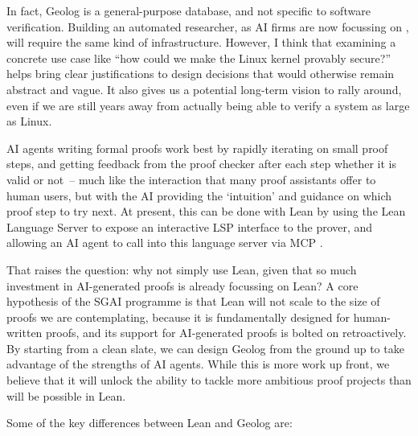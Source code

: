 \documentclass{article}
\begin{document}
In fact, Geolog is a general-purpose database, and not specific to software verification.
Building an automated researcher, as AI firms are now focussing on \citep{Heaven2026}, will require the same kind of infrastructure.
However, I think that examining a concrete use case like ``how could we make the Linux kernel provably secure?'' helps bring clear justifications to design decisions that would otherwise remain abstract and vague.
It also gives us a potential long-term vision to rally around, even if we are still years away from actually being able to verify a system as large as Linux.

AI agents writing formal proofs work best by rapidly iterating on small proof steps, and getting feedback from the proof checker after each step whether it is valid or not~-- much like the interaction that many proof assistants offer to human users, but with the AI providing the `intuition' and guidance on which proof step to try next.
At present, this can be done with Lean by using the Lean Language Server to expose an interactive LSP interface to the prover, and allowing an AI agent to call into this language server via MCP \citep{lean-lsp-mcp}.

That raises the question: why not simply use Lean, given that so much investment in AI-generated proofs is already focussing on Lean?
A core hypothesis of the SGAI programme is that Lean will not scale to the size of proofs we are contemplating, because it is fundamentally designed for human-written proofs, and its support for AI-generated proofs is bolted on retroactively.
By starting from a clean slate, we can design Geolog from the ground up to take advantage of the strengths of AI agents.
While this is more work up front, we believe that it will unlock the ability to tackle more ambitious proof projects than will be possible in Lean.

Some of the key differences between Lean and Geolog are:
\end{document}
